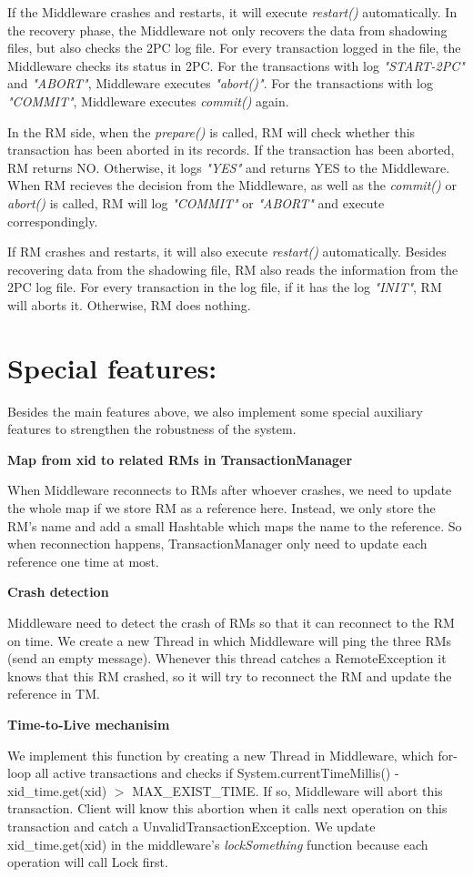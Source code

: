\documentclass[a4paper, 12pt]{article}
\newcommand{\newQuestion}[1]{\section{#1}}
\newcommand{\newPart}[1]{\textbf{\large #1}}
\begin{document}
If the Middleware crashes and restarts, it will execute \textit{restart()} automatically. In the recovery phase, the Middleware not only recovers the data from shadowing files, but also checks the 2PC log file. For every transaction logged in the file, the Middleware checks its status in 2PC. For the transactions with log \textit{"START-2PC"} and \textit{"ABORT"}, Middleware executes \textit{"abort()"}. For the transactions with log \textit{"COMMIT"}, Middleware executes \textit{commit()} again.

In the RM side, when the \textit{prepare()} is called, RM will check whether this transaction has been aborted in its records. If the transaction has been aborted, RM returns NO. Otherwise, it logs \textit{"YES"} and returns YES to the Middleware. When RM recieves the decision from the Middleware, as well as the \textit{commit()} or \textit{abort()} is called, RM will log \textit{"COMMIT"} or \textit{"ABORT"} and execute correspondingly.

If RM crashes and restarts, it will also execute \textit{restart()} automatically. Besides recovering data from the shadowing file, RM also reads the information from the 2PC log file. For every transaction in the log file, if it has the log \textit{"INIT"}, RM will aborts it. Otherwise, RM does nothing.

\newQuestion{Special features:} 

Besides the main features above, we also implement some special auxiliary features to strengthen the robustness of the system.

\newPart{Map from xid to related RMs in TransactionManager}

When Middleware reconnects to RMs after whoever crashes, we need to update the whole map if we store RM as a reference here. Instead, we only store the RM's name and add a small Hashtable which maps the name to the reference. So when reconnection happens, TransactionManager only need to update each reference one time at most.

\newPart{Crash detection}

Middleware need to detect the crash of RMs so that it can reconnect to the RM on time. We create a new Thread in which Middleware will ping the three RMs (send an empty message). Whenever this thread catches a RemoteException it knows that this RM crashed, so it will try to reconnect the RM and update the reference in TM.

\newPart{Time-to-Live mechanisim}

We implement this function by creating a new Thread in Middleware, which for-loop all active transactions and checks if System.currentTimeMillis() - xid\_time.get(xid) $>$ MAX\_EXIST\_TIME. If so, Middleware will abort this transaction. Client will know this abortion when it calls next operation on this transaction and catch a UnvalidTransactionException. We update xid\_time.get(xid) in the middleware's \textit{lockSomething} function because each operation will call Lock first.
\end{document}
